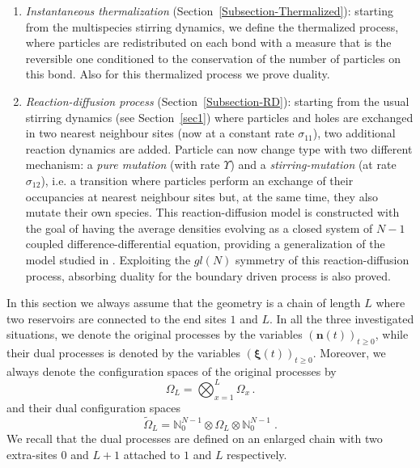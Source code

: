 \documentclass[10pt]{article}
\numberwithin{equation}{section}
\numberwithin{equation}{subsection}
\newcommand{\dt}{\;.}
\newcommand{\fra}[1]{\textcolor[rgb]{0,0,1}{#1}}
\begin{document}
{\begin{enumerate}
	in Appendix~\ref{appendix-1pts-general}, the expression for the one-point correlation.  
	\item \textit{Instantaneous thermalization} (Section~\ref{Subsection-Thermalized}): starting from the multispecies stirring dynamics, we define the thermalized process, where particles are redistributed on each bond with a measure that is the reversible one conditioned to the conservation of the number of particles on this bond. Also for this thermalized process we prove duality. 	
	\item \textit{Reaction-diffusion process} (Section~\ref{Subsection-RD}): {\color{black} starting from the usual stirring dynamics (see Section~\ref{sec1}) where particles and holes are exchanged in two nearest neighbour sites (now at a constant rate $\sigma_{11}$),} {\color{black}two additional reaction} dynamics are added. Particle can now change type {\color{black} with two different mechanism: a \textit{pure mutation} (with rate $\Upsilon$) and a \textit{stirring-mutation} (at rate $\sigma_{12}$), i.e. a transition where particles perform an exchange of their occupancies at nearest neighbour sites but, at the same time, they also mutate their own species.} {\color{black} This reaction-diffusion} model   is  constructed with the goal of having the average densities evolving as a closed system of $N-1$ coupled difference-differential equation, providing a generalization of the model studied in \cite{casini2022uphill}. {\color{black} Exploiting the $gl(N)$ symmetry of this reaction-diffusion process, absorbing duality} for the boundary driven process is also proved.
\end{enumerate}
{\color{black}In this section we always assume that the geometry is a chain of length $L$ where two reservoirs are connected to the end sites $1$ and $L$. In all the three investigated situations, we denote the original processes by the variables $\left(\bm{n}(t)\right)_{t\geq0}$, while their dual processes is denoted by the variables  $(\bm{\xi}(t))_{t\geq 0}$. Moreover, we always denote the configuration spaces of the original processes by
\begin{equation}\label{stateSpace-Chain}
	\Omega_{L}=\bigotimes_{x=1}^{L} \Omega_{x}\,.
\end{equation}
and their dual configuration spaces 
\begin{equation}\label{dualSpace-chain}
	\widetilde{\Omega}_{L}=\mathbb{N}_{0}^{N-1}\otimes \Omega_{L}\otimes \mathbb{N}_{0}^{N-1}\dt
\end{equation}
We recall that the dual processes are defined on an enlarged \fra{chain} with \fra{two extra-sites} $0$ and $L+1$ attached to $1$ and $L$ respectively.}
}
\end{document}

